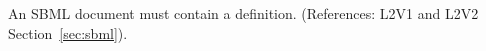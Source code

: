 An SBML document must contain a \Model definition.  (References:
L2V1 and L2V2 Section~\ref{sec:sbml}).
